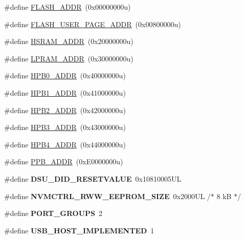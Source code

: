 \begin{DoxyCompactItemize}
\item 
\#define \hyperlink{group___s_a_m_l21_g18_a__definitions_ga485a21e55bcc66416a04d2fec83513fa}{F\+L\+A\+S\+H\+\_\+\+A\+D\+D\+R}~(0x00000000u)
\item 
\#define \hyperlink{group___s_a_m_l21_g18_a__definitions_ga263dc504b29b21d616514ac65000957e}{F\+L\+A\+S\+H\+\_\+\+U\+S\+E\+R\+\_\+\+P\+A\+G\+E\+\_\+\+A\+D\+D\+R}~(0x00800000u)
\item 
\#define \hyperlink{group___s_a_m_l21_g18_a__definitions_ga4af52d124825da5da360f11f45660723}{H\+S\+R\+A\+M\+\_\+\+A\+D\+D\+R}~(0x20000000u)
\item 
\#define \hyperlink{group___s_a_m_l21_g18_a__definitions_gafcca70ccd0ff44656cf27b68218ef780}{L\+P\+R\+A\+M\+\_\+\+A\+D\+D\+R}~(0x30000000u)
\item 
\#define \hyperlink{group___s_a_m_l21_g18_a__definitions_gaa3dc0741f009f571f4a45086601718f6}{H\+P\+B0\+\_\+\+A\+D\+D\+R}~(0x40000000u)
\item 
\#define \hyperlink{group___s_a_m_l21_g18_a__definitions_gabdae009c8fef488e4248183ffa937535}{H\+P\+B1\+\_\+\+A\+D\+D\+R}~(0x41000000u)
\item 
\#define \hyperlink{group___s_a_m_l21_g18_a__definitions_gaef42fa53ddf169a2a50be70d29f73571}{H\+P\+B2\+\_\+\+A\+D\+D\+R}~(0x42000000u)
\item 
\#define \hyperlink{group___s_a_m_l21_g18_a__definitions_gaf04cc27901ff4e0551572de8a92be273}{H\+P\+B3\+\_\+\+A\+D\+D\+R}~(0x43000000u)
\item 
\#define \hyperlink{group___s_a_m_l21_g18_a__definitions_ga715f8d0987dbf1b42ee8453b72b03b9f}{H\+P\+B4\+\_\+\+A\+D\+D\+R}~(0x44000000u)
\item 
\#define \hyperlink{group___s_a_m_l21_g18_a__definitions_ga8895d0a3a9a3126cc44330f86c8ce564}{P\+P\+B\+\_\+\+A\+D\+D\+R}~(0x\+E0000000u)
\item 
\hypertarget{group___s_a_m_l21_g18_a__definitions_gada75131d542c9e1966238f5488f89bd6}{}\#define {\bfseries D\+S\+U\+\_\+\+D\+I\+D\+\_\+\+R\+E\+S\+E\+T\+V\+A\+L\+U\+E}~0x10810005\+U\+L\label{group___s_a_m_l21_g18_a__definitions_gada75131d542c9e1966238f5488f89bd6}

\item 
\hypertarget{group___s_a_m_l21_g18_a__definitions_gacb7a115808eeb0b50bd55888f9ba65ae}{}\#define {\bfseries N\+V\+M\+C\+T\+R\+L\+\_\+\+R\+W\+W\+\_\+\+E\+E\+P\+R\+O\+M\+\_\+\+S\+I\+Z\+E}~0x2000\+U\+L /$\ast$ 8 k\+B $\ast$/\label{group___s_a_m_l21_g18_a__definitions_gacb7a115808eeb0b50bd55888f9ba65ae}

\item 
\hypertarget{group___s_a_m_l21_g18_a__definitions_gab9243ffe03a1dc631b57a495b4b3d467}{}\#define {\bfseries P\+O\+R\+T\+\_\+\+G\+R\+O\+U\+P\+S}~2\label{group___s_a_m_l21_g18_a__definitions_gab9243ffe03a1dc631b57a495b4b3d467}

\item 
\hypertarget{group___s_a_m_l21_g18_a__definitions_ga880f394946155d1e85a5fde38b7f825a}{}\#define {\bfseries U\+S\+B\+\_\+\+H\+O\+S\+T\+\_\+\+I\+M\+P\+L\+E\+M\+E\+N\+T\+E\+D}~1\label{group___s_a_m_l21_g18_a__definitions_ga880f394946155d1e85a5fde38b7f825a}

\end{DoxyCompactItemize}
